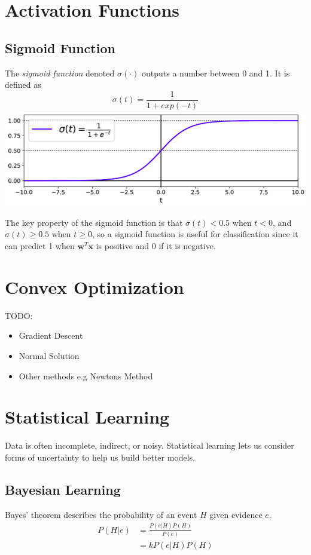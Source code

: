 \documentclass[12pt]{article}
\begin{document}
\section{Activation Functions}
    \subsection{Sigmoid Function}
        The \textit{sigmoid function} denoted $\sigma(\cdot)$ outputs a number between 0 and 1. It is defined as
        $$ \sigma(t) = \frac{1}{1 + exp(-t)} $$
        \includegraphics[scale=0.7]{sigmoid}

        The key property of the sigmoid function is that $\sigma(t) < 0.5$ when $t < 0$, and $\sigma(t) \geq 0.5$ when $t \geq 0$, so a sigmoid function is useful for classification since it can predict 1 when $\boldsymbol{w}^T\boldsymbol{x}$
        is positive and 0 if it is negative.

\section{Convex Optimization}
    TODO:
    \begin{itemize}
        \item Gradient Descent
        \item Normal Solution
        \item Other methods e.g Newtons Method
    \end{itemize}

\section{Statistical Learning}
    Data is often incomplete, indirect, or noisy. Statistical learning lets us consider forms of uncertainty to help us build better models.

    \subsection{Bayesian Learning}
    Bayes' theorem describes the probability of an event $H$ given evidence $e$.
    \begin{align}
        P(H|e) &= \frac{P(e|H)P(H)}{P(e)} \\
        &= kP(e|H)P(H)
    \end{align}
\end{document}
